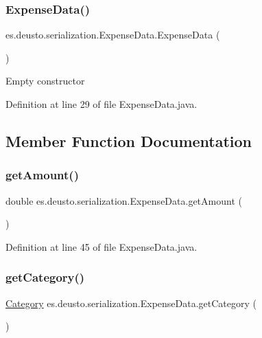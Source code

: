 \subsubsection{\texorpdfstring{Expense\+Data()}{ExpenseData()}\hspace{0.1cm}{\footnotesize\ttfamily [2/2]}}
{\footnotesize\ttfamily es.\+deusto.\+serialization.\+Expense\+Data.\+Expense\+Data (\begin{DoxyParamCaption}{ }\end{DoxyParamCaption})}

Empty constructor 

Definition at line 29 of file Expense\+Data.\+java.



\subsection{Member Function Documentation}
\mbox{\label{classes_1_1deusto_1_1serialization_1_1_expense_data_a9b0652de8009eca9d315aa0d041138a2}} 
\subsubsection{\texorpdfstring{get\+Amount()}{getAmount()}}
{\footnotesize\ttfamily double es.\+deusto.\+serialization.\+Expense\+Data.\+get\+Amount (\begin{DoxyParamCaption}{ }\end{DoxyParamCaption})}



Definition at line 45 of file Expense\+Data.\+java.

\mbox{\label{classes_1_1deusto_1_1serialization_1_1_expense_data_aa53e9ee1ef7220a272b043e475f504f1}} 
\subsubsection{\texorpdfstring{get\+Category()}{getCategory()}}
{\footnotesize\ttfamily \hyperlink{enumes_1_1deusto_1_1server_1_1jdo_1_1_category}{Category} es.\+deusto.\+serialization.\+Expense\+Data.\+get\+Category (\begin{DoxyParamCaption}{ }\end{DoxyParamCaption})}



